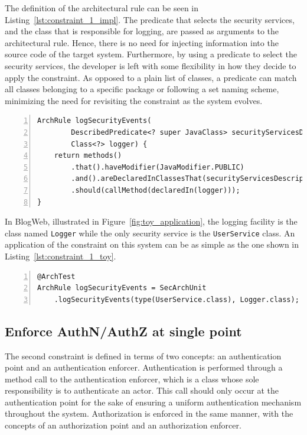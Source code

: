 The definition of the architectural rule can be seen in Listing~\ref{lst:constraint_1_impl}. The predicate that selects the security services, and the class that is responsible for logging, are passed as arguments to the architectural rule. Hence, there is no need for injecting information into the source code of the target system. Furthermore, by using a predicate to select the security services, the developer is left with some flexibility in how they decide to apply the constraint. As opposed to a plain list of classes, a predicate can match all classes belonging to a specific package or following a set naming scheme, minimizing the need for revisiting the constraint as the system evolves.

\begin{minipage}{\linewidth}
\begin{lstlisting}[caption={Rule definition for constraint 1.}, captionpos=b, label=lst:constraint_1_impl, numbers=left]
ArchRule logSecurityEvents(
        DescribedPredicate<? super JavaClass> securityServicesDescriptor,
        Class<?> logger) {
    return methods()
        .that().haveModifier(JavaModifier.PUBLIC)
        .and().areDeclaredInClassesThat(securityServicesDescriptor)
        .should(callMethod(declaredIn(logger)));
}
\end{lstlisting}
\end{minipage}

In BlogWeb, illustrated in Figure~\ref{fig:toy_application}, the logging facility is the class named \texttt{Logger} while the only security service is the \texttt{UserService} class. An application of the constraint on this system can be as simple as the one shown in Listing~\ref{lst:constraint_1_toy}.

\begin{minipage}{\linewidth}
\begin{lstlisting}[caption={Application of constraint 1 to BlogWeb.}, captionpos=b, label=lst:constraint_1_toy, numbers=left]
@ArchTest
ArchRule logSecurityEvents = SecArchUnit
    .logSecurityEvents(type(UserService.class), Logger.class);
\end{lstlisting}
\end{minipage}

\subsection{Enforce AuthN/AuthZ at single point}
The second constraint is defined in terms of two concepts: an authentication point and an authentication enforcer. Authentication is performed through a method call to the authentication enforcer, which is a class whose sole responsibility is to authenticate an actor. This call should only occur at the authentication point for the sake of ensuring a uniform authentication mechanism throughout the system. Authorization is enforced in the same manner, with the concepts of an authorization point and an authorization enforcer.

